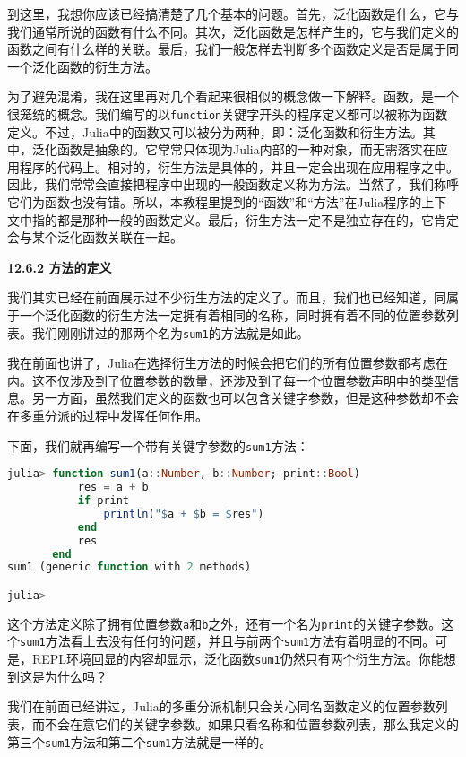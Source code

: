 到这里，我想你应该已经搞清楚了几个基本的问题。首先，泛化函数是什么，它与我们通常所说的函数有什么不同。其次，泛化函数是怎样产生的，它与我们定义的函数之间有什么样的关联。最后，我们一般怎样去判断多个函数定义是否是属于同一个泛化函数的衍生方法。

为了避免混淆，我在这里再对几个看起来很相似的概念做一下解释。函数，是一个很笼统的概念。我们编写的以\verb|function|关键字开头的程序定义都可以被称为函数定义。不过，Julia中的函数又可以被分为两种，即：泛化函数和衍生方法。其中，泛化函数是抽象的。它常常只体现为Julia内部的一种对象，而无需落实在应用程序的代码上。相对的，衍生方法是具体的，并且一定会出现在应用程序之中。因此，我们常常会直接把程序中出现的一般函数定义称为方法。当然了，我们称呼它们为函数也没有错。所以，本教程里提到的“函数”和“方法”在Julia程序的上下文中指的都是那种一般的函数定义。最后，衍生方法一定不是独立存在的，它肯定会与某个泛化函数关联在一起。

\textbf{12.6.2 方法的定义}

我们其实已经在前面展示过不少衍生方法的定义了。而且，我们也已经知道，同属于一个泛化函数的衍生方法一定拥有着相同的名称，同时拥有着不同的位置参数列表。我们刚刚讲过的那两个名为\verb|sum1|的方法就是如此。

我在前面也讲了，Julia在选择衍生方法的时候会把它们的所有位置参数都考虑在内。这不仅涉及到了位置参数的数量，还涉及到了每一个位置参数声明中的类型信息。另一方面，虽然我们定义的函数也可以包含关键字参数，但是这种参数却不会在多重分派的过程中发挥任何作用。

下面，我们就再编写一个带有关键字参数的\verb|sum1|方法：

\begin{lstlisting}[language=julia]
julia> function sum1(a::Number, b::Number; print::Bool)
           res = a + b
           if print
               println("$a + $b = $res")
           end
           res
       end
sum1 (generic function with 2 methods)

julia>
\end{lstlisting}

这个方法定义除了拥有位置参数\verb|a|和\verb|b|之外，还有一个名为\verb|print|的关键字参数。这个\verb|sum1|方法看上去没有任何的问题，并且与前两个\verb|sum1|方法有着明显的不同。可是，REPL环境回显的内容却显示，泛化函数\verb|sum1|仍然只有两个衍生方法。你能想到这是为什么吗？

我们在前面已经讲过，Julia的多重分派机制只会关心同名函数定义的位置参数列表，而不会在意它们的关键字参数。如果只看名称和位置参数列表，那么我定义的第三个\verb|sum1|方法和第二个\verb|sum1|方法就是一样的。

